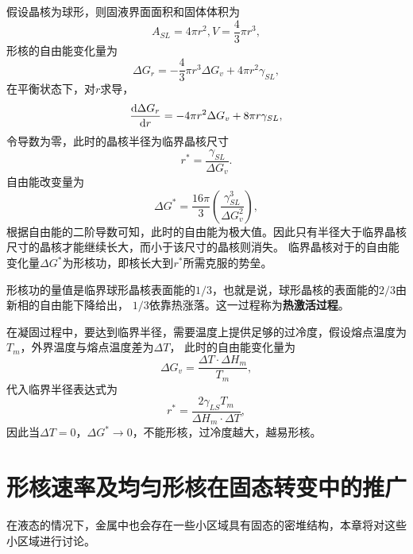         假设晶核为球形，则固液界面面积和固体体积为
        \begin{equation}
            A_{SL}=4\pi r^2, V=\frac{4}{3}\pi r^3,
        \end{equation}
        形核的自由能变化量为
        \begin{equation}
            \Delta G_r=-\frac{4}{3}\pi r^3\Delta G_v+4\pi r^2\gamma_{SL},
        \end{equation}
        在平衡状态下，对$r$求导，
        \begin{equation}
            \frac{\mathop{}\!\mathrm{d} \Delta G_r }{\mathop{}\!\mathrm{d} r}=-4\pi r^2\Delta G_v+8\pi r\gamma_{SL},
        \end{equation}
        令导数为零，此时的晶核半径为临界晶核尺寸
        \begin{equation}
            r^*=\frac{\gamma_{SL}}{\Delta G_v}.
        \end{equation}
        自由能改变量为
        \begin{equation}
            \Delta G^*=\frac{16\pi}{3}\left( \frac{\gamma_{SL}^3}{\Delta G_v^2} \right),
        \end{equation}
        根据自由能的二阶导数可知，此时的自由能为极大值。因此只有半径大于临界晶核尺寸的晶核才能继续长大，而小于该尺寸的晶核则消失。
        临界晶核对于的自由能变化量$\Delta G^*$为形核功，即核长大到$r^*$所需克服的势垒。

        形核功的量值是临界球形晶核表面能的$1/3$，也就是说，球形晶核的表面能的$2/3$由新相的自由能下降给出，
        $1/3$依靠热涨落。这一过程称为\textbf{热激活过程}。

        在凝固过程中，要达到临界半径，需要温度上提供足够的过冷度，假设熔点温度为$T_m$，外界温度与熔点温度差为$\Delta T$，
        此时的自由能变化量为
        \begin{equation}
            \Delta G_v=\frac{\Delta T\cdot\Delta H_m}{T_m},
        \end{equation}
        代入临界半径表达式为
        \begin{equation}
            r^*=\frac{2\gamma_{LS}T_m}{\Delta H_m\cdot\Delta T},
        \end{equation}
        因此当$\Delta T=0$，$\Delta G^*\to0$，不能形核，过冷度越大，越易形核。
    \section{形核速率及均匀形核在固态转变中的推广}
        在液态的情况下，金属中也会存在一些小区域具有固态的密堆结构，本章将对这些小区域进行讨论。

